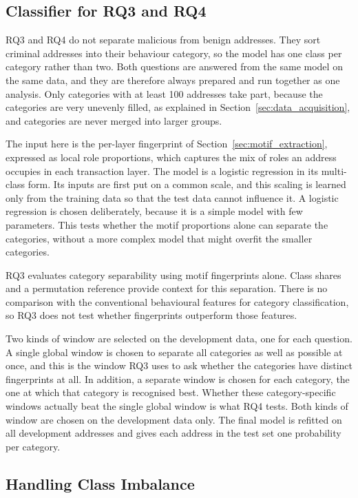 \documentclass{thesisclass}
\begin{document}
\subsection{Classifier for RQ3 and RQ4}

RQ3 and RQ4 do not separate malicious from benign addresses. They sort criminal
addresses into their behaviour category, so the model has one class per category
rather than two. Both questions are answered from the same model on the same
data, and they are therefore always prepared and run together as one analysis.
Only categories with at least 100 addresses take part, because the categories are
very unevenly filled, as explained in Section~\ref{sec:data_acquisition}, and
categories are never merged into larger groups.

The input here is the per-layer fingerprint of
Section~\ref{sec:motif_extraction}, expressed as local role proportions, which captures
the mix of roles an address occupies in each transaction layer. The model is a
logistic regression in its multi-class form. Its inputs are first put on a common
scale, and this scaling is learned only from the training data so that the test
data cannot influence it. A logistic regression is chosen deliberately, because it
is a simple model with few parameters. This tests whether the motif proportions
alone can separate the categories, without a more complex model that might overfit
the smaller categories.

RQ3 evaluates category separability using motif fingerprints alone. Class
shares and a permutation reference provide context for this separation.
There is no comparison with the conventional behavioural features for category
classification, so RQ3 does not test whether fingerprints outperform those
features.

Two kinds of window are selected on the development data, one for each question. A
single global window is chosen to separate all categories as well as possible at
once, and this is the window RQ3 uses to ask whether the categories have distinct
fingerprints at all. In addition, a separate window is chosen for each category,
the one at which that category is recognised best. Whether these category-specific
windows actually beat the single global window is what RQ4 tests. Both kinds of
window are chosen on the development data only. The final model is refitted on all
development addresses and gives each address in the test set one probability per
category.

\subsection{Handling Class Imbalance}
\end{document}
